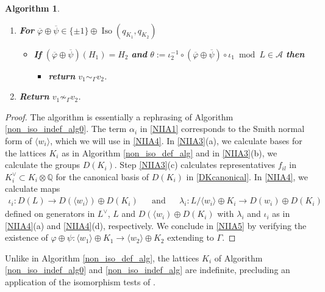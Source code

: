 \documentclass[12pt, a4paper]{article}
\newtheorem{algo}{Algorithm}[section]
\newcommand{\QQ}{\mathbb{Q}}
\newcommand{\la}{\langle}
\newcommand{\ra}{\rangle}
\newcommand{\Ac}{\mathcal{A}}
\newcommand{\opn}{\operatorname}
\newcommand{\op}{\oplus}
\newcommand{\bi}{\begin{itemize}}
\newcommand{\ei}{\end{itemize}}
\begin{document}
\begin{algo}
\begin{enumerate}
\begin{enumerate}
      $\lambda_i:= \theta_{i3} \circ \theta_{i2} \circ \theta_{i1}^{-1}$.
    \item \textbf{Let} $H_i$ be the subgroup of $D(\la w_i \ra) \op D(K_i)$ generated by the columns of $\lambda_i$ taken modulo ${}^{\tau}(\vert w_i^2 \vert, d_1, \ldots, d_n)$. 
  \item \textbf{If} $H_1 \not \cong H_2$ \textbf{then return} $v_1 \not \sim_{\Gamma} v_2$.
  \item \textbf{Let} $\iota_i:= \lambda_i  \circ G(L)^{-1}$.
    \end{enumerate}
 \item \textbf{For} $\overline{\varphi} \op \overline{\psi} \in \{ \pm 1 \} \op \opn{Iso}(q_{K_1}, q_{K_2})$ \label{NIIA5}
    \bi
    \item[] \textbf{If} $(\overline{\varphi} \op \overline{\psi})(H_1) = H_2$ \textbf{and} $\theta:=\iota_2^{-1} \circ (\overline{\varphi} \op \overline{\psi}) \circ \iota_1 \bmod{L} \in \Ac$ \textbf{then}
      \bi
      \item[] \textbf{return} $v_1 \sim_{\Gamma} v_2$.  
      \ei
      \ei
    \item \textbf{Return} $v_1 \not \sim_{\Gamma} v_2$.
  \end{enumerate}
\end{algo}
\begin{proof}
The algorithm is essentially a rephrasing of Algorithm \ref{non_iso_indef_alg0}.
The term $\alpha_i$ in \ref{NIIA1} corresponds to the Smith normal form of $\la w_i \ra$, which we will use in \ref{NIIA4}.
  In \ref{NIIA3}(a), we calculate bases for the lattices $K_i$ as in Algorithm \ref{non_iso_def_alg} and in \ref{NIIA3}(b), we calculate the groups $D(K_i)$.
  Step \ref{NIIA3}(c) calculates representatives $f_{il}$ in $K_i^{\vee} \subset K_i \otimes \QQ$ for the canonical basis of $D(K_i)$ in \eqref{DKcanonical}.
  In \ref{NIIA4}, we calculate maps
\begin{align*}
    \iota_i:D(L) \rightarrow D(\la w_i \ra) \op D(K_i)
      && \text{and} &&
    \lambda_i:L / \la w_i \ra \op K_i \rightarrow D( w_i) \op D(K_i) 
  \end{align*}
  defined on generators in $L^{\vee}$, $L$ and $D(\la w_i) \op D(K_i)$ with $\lambda_i$ and $\iota_i$ as in \ref{NIIA4}(a) and \ref{NIIA4}(d), respectively.
  We conclude in \ref{NIIA5} by verifying the existence of
  $\varphi \op \psi:\la w_1 \ra \op K_1 \rightarrow \la w_2 \ra \op K_2$ extending to $\Gamma$.
\end{proof}
Unlike in Algorithm \ref{non_iso_def_alg}, the lattices $K_i$ of Algorithm \ref{non_iso_indef_alg0} and \ref{non_iso_indef_alg} are indefinite, precluding an application of the isomorphism tests of \cite{PleskenPohst, PleskenSouvignier}.
\end{document}
